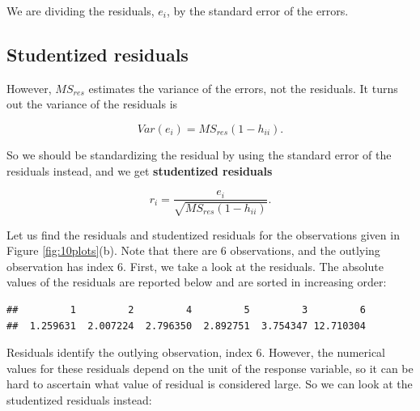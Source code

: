 \documentclass[
]{book}
\newenvironment{Shaded}{\begin{snugshade}}{\end{snugshade}}
\newcommand{\DocumentationTok}[1]{\textcolor[rgb]{0.56,0.35,0.01}{\textbf{\textit{#1}}}}
\newcommand{\FunctionTok}[1]{\textcolor[rgb]{0.13,0.29,0.53}{\textbf{#1}}}
\newcommand{\NormalTok}[1]{#1}
\newcommand{\SpecialCharTok}[1]{\textcolor[rgb]{0.81,0.36,0.00}{\textbf{#1}}}
\begin{document}
We are dividing the residuals, \(e_i\), by the standard error of the errors.

\hypertarget{studentized-residuals}{%
\subsection{Studentized residuals}\label{studentized-residuals}}

However, \(MS_{res}\) estimates the variance of the errors, not the residuals. It turns out the variance of the residuals is

\begin{equation}
Var (e_i) = MS_{res}(1-h_{ii}).
\label{eq:10var}
\end{equation}

So we should be standardizing the residual by using the standard error of the residuals instead, and we get \textbf{studentized residuals}

\begin{equation}
r_i = \frac{e_i}{\sqrt{MS_{res}(1-h_{ii})}}.
\label{eq:10ri}
\end{equation}

Let us find the residuals and studentized residuals for the observations given in Figure \ref{fig:10plots}(b). Note that there are 6 observations, and the outlying observation has index 6. First, we take a look at the residuals. The absolute values of the residuals are reported below and are sorted in increasing order:

\begin{Shaded}
\end{Shaded}

\begin{verbatim}
##         1         2         4         5         3         6 
##  1.259631  2.007224  2.796350  2.892751  3.754347 12.710304
\end{verbatim}

Residuals identify the outlying observation, index 6. However, the numerical values for these residuals depend on the unit of the response variable, so it can be hard to ascertain what value of residual is considered large. So we can look at the studentized residuals instead:
\end{document}
